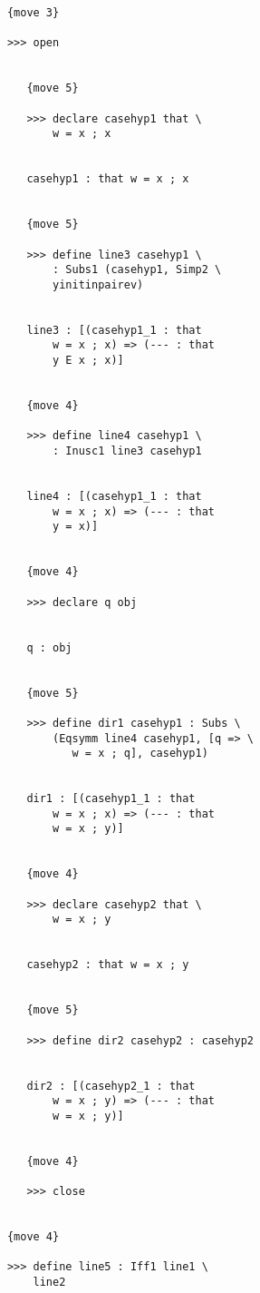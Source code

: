 \documentclass[12pt]{article}
\begin{document}
\begin{verbatim}
            {move 3}

            >>> open


               {move 5}

               >>> declare casehyp1 that \
                   w = x ; x


               casehyp1 : that w = x ; x


               {move 5}

               >>> define line3 casehyp1 \
                   : Subs1 (casehyp1, Simp2 \
                   yinitinpairev)


               line3 : [(casehyp1_1 : that 
                   w = x ; x) => (--- : that 
                   y E x ; x)]


               {move 4}

               >>> define line4 casehyp1 \
                   : Inusc1 line3 casehyp1


               line4 : [(casehyp1_1 : that 
                   w = x ; x) => (--- : that 
                   y = x)]


               {move 4}

               >>> declare q obj


               q : obj


               {move 5}

               >>> define dir1 casehyp1 : Subs \
                   (Eqsymm line4 casehyp1, [q => \
                      w = x ; q], casehyp1)


               dir1 : [(casehyp1_1 : that 
                   w = x ; x) => (--- : that 
                   w = x ; y)]


               {move 4}

               >>> declare casehyp2 that \
                   w = x ; y


               casehyp2 : that w = x ; y


               {move 5}

               >>> define dir2 casehyp2 : casehyp2


               dir2 : [(casehyp2_1 : that 
                   w = x ; y) => (--- : that 
                   w = x ; y)]


               {move 4}

               >>> close


            {move 4}

            >>> define line5 : Iff1 line1 \
                line2



\end{verbatim}
\end{document}
